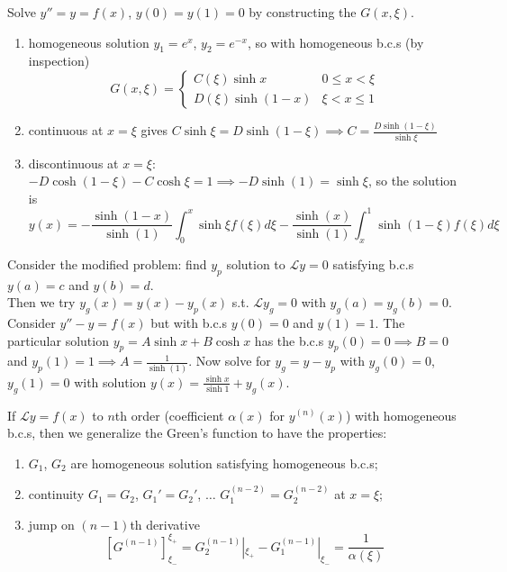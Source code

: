 \documentclass[a4paper]{article}
\begin{document}
\begin{eg}
Solve $y''=y=f(x)$, $y(0)=y(1)=0$ by constructing the $G(x,\xi)$. 
\begin{enumerate}
    \item homogeneous solution $y_1=e^x$, $y_2=e^{-x}$, so with homogeneous b.c.s (by inspection)
$$
  G(x,\xi)=\left\{
        \begin{array}{ll}
      C(\xi)\sinh x& 0\leq x<\xi\\
      D(\xi)\sinh(1-x) & \xi<x\leq 1
        \end{array}\right.$$
        \item continuous at $x=\xi$ gives  $    C\sinh\xi=D\sinh(1-\xi)\implies C=\frac{D\sinh(1-\xi)}{\sinh\xi}$
        \item discontinuous at $x=\xi$: $-D\cosh(1-\xi)-C\cosh\xi=1\implies -D\sinh(1)=\sinh\xi$, 
so the solution is
$$
y(x)=-\frac{\sinh(1-x)}{\sinh(1)}\int_0^x\sinh\xi f(\xi)d\xi-\frac{\sinh(x)}{\sinh(1)}\int_x^1\sinh(1-\xi)f(\xi)d\xi$$
\end{enumerate}
\end{eg}
\begin{remarks}[Inhomogeneous b.c.s]
Consider the modified problem: find $y_p$ solution to $\mathcal{L}y=0$ satisfying b.c.s $y(a)=c$ and $y(b)=d$.\\[5pt]
Then we try $y_g(x)=y(x)-y_p(x)$ s.t. $\mathcal{L}y_g=0$ with $y_g(a)=y_g(b)=0$. Consider $y''-y=f(x)$ but with b.c.s $y(0)=0$ and $y(1)=1$. The particular solution $y_p=A\sinh x+B\cosh x$ has the b.c.s $y_p(0)=0\implies B=0$ and $y_p(1)=1\implies A=\frac{1}{\sinh(1)}$. Now solve for $y_g=y-y_p$ with $y_g(0)=0$, $y_g(1)=0$ with solution $y(x)=\frac{\sinh x}{\sinh 1}+y_g(x)$.
\end{remarks}
\begin{remarks}
If $\mathcal{L}y=f(x)$ to $n$th order (coefficient $\alpha(x)$ for $y^{(n)}(x)$) with homogeneous b.c.s, then we generalize the Green's function to have the properties:
\begin{enumerate}
    \item $G_1$, $G_2$ are homogeneous solution satisfying homogeneous b.c.s;
    \item continuity $G_1=G_2$, $G_1'=G_2'$, $\dots$ $G_1^{(n-2)}=G_2^{(n-2)}$ at $x=\xi$;
    \item jump on $(n-1)$th derivative
    $$[G^{(n-1)}]_{\xi_-}^{\xi_+}=G_2^{(n-1)}|_{\xi_+}-G_1^{(n-1)}|_{\xi_-}=\frac{1}{\alpha(\xi)}$$
\end{enumerate}
\end{remarks}
\end{document}
